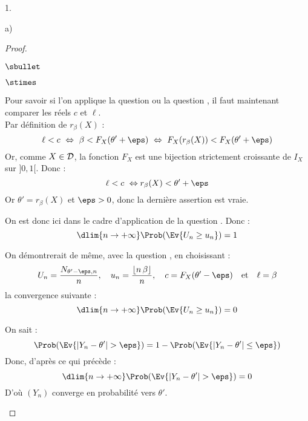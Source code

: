 \begin{noliste}{1.}
\begin{noliste}{a)}
\begin{proof}
\begin{noliste}{$\sbullet$}
\begin{noliste}{$\stimes$}
	  \item Pour savoir si l'on applique la question 
	  ou la question , il faut maintenant comparer les 
	  réels $c$ et $\ell$.\\
	  Par définition de $r_\beta(X)$ :
	  \[
	    \ell < c \ \Leftrightarrow \ \beta < F_X(\theta' +\eps)
	    \ \Leftrightarrow \ F_X(r_\beta(X)) < F_X(\theta' +\eps)
	  \]
	  Or, comme $X\in {\cal D}$, la fonction $F_X$ est une 
	  bijection strictement croissante de $I_X$ sur $]0,1[$. Donc :
	  \[
	    \ell < c \ \Leftrightarrow r_\beta(X) < \theta'+\eps
	  \]
	  Or $\theta'=r_\beta(X)$ et $\eps >0$, donc la dernière 
	  assertion est vraie.
	  
	  \item On est donc ici dans le cadre d'application de la 
	question . Donc :
	\[
	  \dlim{n\to +\infty} \Prob(\Ev{U_n \geq u_n})=1
	\]
	
	\item On démontrerait de même, avec la question , en 
	choisissant :
	\[
	  U_n = \dfrac{N_{\theta'-\eps,n}}{n}, \quad u_n = 
	  \dfrac{\lfloor n \, \beta \rfloor}{n}, \quad c = F_X(\theta'
	  -\eps) \quad \text{et} \quad \ell = \beta
	\]
	la convergence suivante :
	\[
	  \dlim{n\to +\infty} \Prob(\Ev{U_n \geq u_n})=0
	\]
	\end{noliste}
	
	
	
	\newpage
	
	
	
	\item On sait :
	\[
	  \Prob(\Ev{\vert Y_n - \theta' \vert >\eps}) = 
	  1-\Prob(\Ev{\vert Y_n - \theta'\vert \leq \eps})
	\]
	Donc, d'après ce qui précède :
	\[
	  \dlim{n\to +\infty} \Prob(\Ev{\vert Y_n - \theta' 
	  \vert >\eps}) = 0
	\]
	D'où $(Y_n)$ converge en probabilité vers $\theta'$.
      \end{noliste}
      

\end{proof}
\end{noliste}
\end{noliste}
